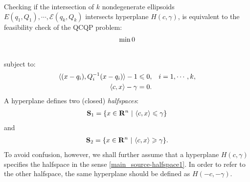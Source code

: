 \documentclass[letterpaper,10pt,english]{sphinxmanual}
\begin{document}
Checking if the intersection of $k$ nondegenerate ellipsoids
$E(q_1,Q_1),\cdots,{\mathcal E}(q_k,Q_k)$ intersects hyperplane
$H(c,\gamma)$, is equivalent to the feasibility check of the QCQP
problem:
\begin{gather}
\begin{split}\min 0\end{split}\notag\\\begin{split}\end{split}\notag
\end{gather}
subject to:
\begin{gather}
\begin{split}\begin{aligned}
\langle (x-q_i),Q_i^{-1}(x-q_i)\rangle - 1 \leqslant0, & & i=1,\cdots,k,\\
\langle c, x\rangle - \gamma = 0. & &\end{aligned}\end{split}\notag
\end{gather}
A hyperplane defines two (closed) \emph{halfspaces}:
\label{main_source:equation-halfspace1}\begin{gather}
\begin{split}{\bf S}_1 = \{x\in{\bf R}^n ~|~ \langle c, x\rangle \leqslant\gamma\}\end{split}\label{main_source-halfspace1}
\end{gather}
and
\label{main_source:equation-halfspace2}\begin{gather}
\begin{split}{\bf S}_2 = \{x\in{\bf R}^n ~|~ \langle c, x\rangle \geqslant\gamma\}.\end{split}\label{main_source-halfspace2}
\end{gather}
To avoid confusion, however, we shall further assume that a hyperplane
$H(c,\gamma)$ specifies the halfspace in the sense \eqref{main_source-halfspace1}.
In order to refer to the other halfspace, the same hyperplane should be
defined as $H(-c,-\gamma)$.
\end{document}

